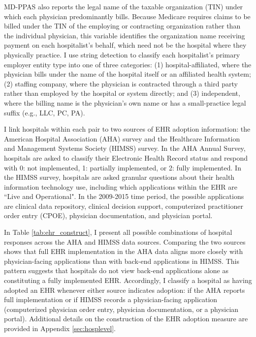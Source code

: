 \documentclass[12pt]{article}
\begin{document}
MD-PPAS also reports the legal name of the taxable organization (TIN) under which each physician predominantly bills. Because Medicare requires claims to be billed under the TIN of the employing or contracting organization rather than the individual physician, this variable identifies the organization name receiving payment on each hospitalist's behalf, which need not be the hospital where they physically practice. I use string detection to classify each hospitalist's primary employer entity type into one of three categories: (1) hospital-affiliated, where the physician bills under the name of the hospital itself or an affiliated health system; (2) staffing company, where the physician is contracted through a third party rather than employed by the hospital or system directly; and (3) independent, where the billing name is the physician's own name or has a small-practice legal suffix (e.g., LLC, PC, PA). 

I link hospitals within each pair to two sources of EHR adoption information: the American Hospital Association (AHA) survey and the Healthcare Information and Management Systems Society (HIMSS) survey. In the AHA Annual Survey, hospitals are asked to classify their Electronic Health Record status and respond with 0: not implemented, 1: partially implemented, or 2: fully implemented. In the HIMSS survey, hospitals are asked granular questions about their health information technology use, including which applications within the EHR are ``Live and Operational". In the 2009-2015 time period, the possible applications are clinical data repository, clinical decision support, computerized practitioner order entry (CPOE), physician documentation, and physician portal. 

In Table \ref{tab:ehr_construct}, I present all possible combinations of hospital responses across the AHA and HIMSS data sources. Comparing the two sources shows that full EHR implementation in the AHA data aligns more closely with physician-facing applications than with back-end applications in HIMSS. This pattern suggests that hospitals do not view back-end applications alone as constituting a fully implemented EHR. Accordingly, I classify a hospital as having adopted an EHR whenever either source indicates adoption: if the AHA reports full implementation or if HIMSS records a physician-facing application (computerized physician order entry, physician documentation, or a physician portal). Additional details on the construction of the EHR adoption measure are provided in Appendix \ref{sec:hosplevel}.
\end{document}
